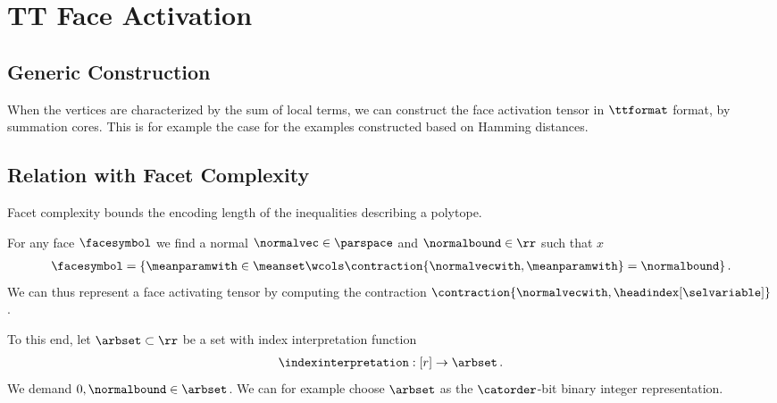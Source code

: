 \section{TT Face Activation}


\subsection{Generic Construction}

When the vertices are characterized by the sum of local terms, we can construct the face activation tensor in $\ttformat$ format, by summation cores.
This is for example the case for the examples constructed based on Hamming distances.

\subsection{Relation with Facet Complexity}

Facet complexity \cite[Definition 6.2.2]{grotschel_geometric_1993} bounds the encoding length of the inequalities describing a polytope.

For any face $\facesymbol$ we find a normal $\normalvec\in\parspace$ and $\normalbound\in\rr$ such that $x$
\begin{align*}
    \facesymbol =
    \{\meanparamwith\in\meanset \wcols \contraction{\normalvecwith,\meanparamwith}=\normalbound \}\, .
\end{align*}
We can thus represent a face activating tensor by computing the contraction $\contraction{\normalvecwith,\headindex[\selvariable]}$.

To this end, let $\arbset\subset\rr$ be a set with index interpretation function
\begin{align*}
    \indexinterpretation : [r] \rightarrow \arbset \, .
\end{align*}
We demand $0,\normalbound\in\arbset$.
We can for example choose $\arbset$ as the $\catorder$-bit binary integer representation.

